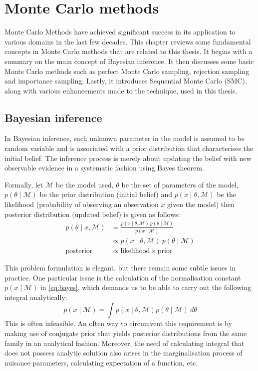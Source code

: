 \chapter{Monte Carlo methods}
\graphicspath{{Chapter2/figures/}}
\label{cha:mcmethods}
Monte Carlo Methods have achieved significant success in its application to various domains in the last few decades. This chapter reviews some fundamental concepts in Monte Carlo methods that are related to this thesis. It begins with a summary on the main concept of Bayesian inference. It then discusses some basic Monte Carlo methods such as perfect Monte Carlo sampling, rejection sampling and importance sampling. Lastly, it introduces Sequential Monte Carlo (SMC), along with various enhancements made to the technique, used in this thesis.

\section{Bayesian inference}
In Bayesian inference, each unknown parameter in the model is assumed to be random variable and is associated with a prior distribution that characterises the initial belief. The inference process is merely about updating the belief with new observable evidence in a systematic fashion using Bayes theorem.

Formally, let $\mathcal{M}$ be the model used, $\theta$ be the set of parameters of the model, $p\left(\theta \mid \mathcal{M}\right)$ be the prior distribution (initial belief) and $p(x \mid \theta, \mathcal{M})$ be the likelihood (probability of observing an observation $x$ given the model) then posterior distribution (updated belief) is given as follows:  
\begin{align}
  p(\theta \mid x , \mathcal{M}) &= \frac{p(x \mid \theta , \mathcal{M})~p(\theta \mid \mathcal{M})}{p(x \mid \mathcal{M})} \nonumber \\
                   &\propto p(x \mid \theta , \mathcal{M})~p(\theta \mid \mathcal{M}) \label{eq:bayes} \\
  \text{posterior} &\propto \text{likelihood} \times \text{prior}
\end{align}

This problem formulation is elegant, but there remain some subtle issues in practice. One particular issue is the calculation of the normalisation constant $p(x \mid \mathcal{M})$ in \eqref{eq:bayes}, which demands us to be able to carry out the following integral  analytically:
\begin{equation}
  p(x \mid \mathcal{M}) = \int p(x \mid \theta, \mathcal{M}) p(\theta \mid \mathcal{M})~d\theta
\end{equation}
This is often infeasible. An often way to circumvent this requirement is by making use of conjugate prior that yields posterior distributions from the same family in an analytical fashion. Moreover, the need of calculating integral that does not possess analytic solution also arises in the marginalisation process of nuisance parameters, calculating expectation of a function, etc.

